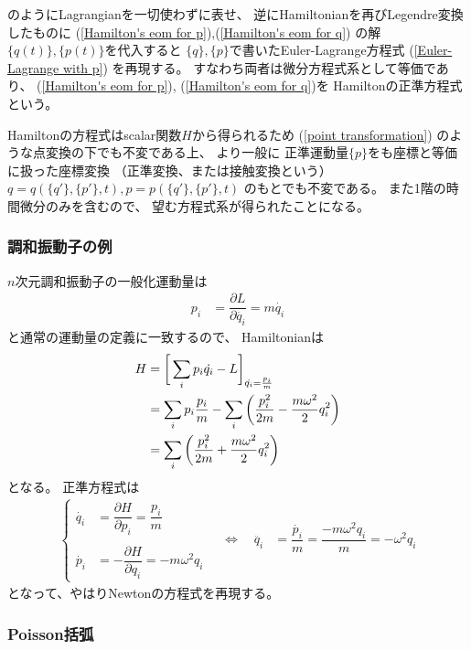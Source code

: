 のようにLagrangianを一切使わずに表せ、
逆にHamiltonianを再びLegendre変換したものに
(\ref{Hamilton's eom for p}),(\ref{Hamilton's eom for q})
の解$\{q(t)\},\{p(t)\}$を代入すると
$\{q\},\{p\}$で書いたEuler-Lagrange方程式
(\ref{Euler-Lagrange with p})
を再現する。
すなわち両者は微分方程式系として等価であり、
(\ref{Hamilton's eom for p}),
(\ref{Hamilton's eom for q})を
Hamiltonの正準方程式という。

Hamiltonの方程式はscalar関数$H$から得られるため
(\ref{point transformation})
のような点変換の下でも不変である上、
より一般に
正準運動量$\{p\}$をも座標と等価に扱った座標変換
（正準変換、または接触変換という）
$q = q(\{q'\}, \{p'\}, t ) ,
p = p(\{q'\}, \{p'\}, t )
$
のもとでも不変である。
また1階の時間微分のみを含むので、
望む方程式系が得られたことになる。

\subsubsection{調和振動子の例}

$n$次元調和振動子の一般化運動量は
\begin{align}
  p_i &= \dfrac{\partial L}{\partial \dot{q_i}}
=
  m \dot{q_i}
\end{align}
と通常の運動量の定義に一致するので、
Hamiltonianは
\begin{align}
  H &= \bigg[
    \sum_i p_i \dot{q_i}
    - L
    \bigg]_{ \dot{q_i} = \frac{p_i}{m} }
\notag\\&=
    \sum_i p_i \frac{p_i}{m}
    -
      \sum_i \bigg(
      \dfrac{p_i^2}{2m}
    -
      \dfrac{ m \omega^2 }{2}
      q_i^2
    \bigg)
\notag\\&=
    \sum_i \bigg(
      \dfrac{p_i^2}{2m}
    +
      \dfrac{ m \omega^2 }{2}
      q_i^2
    \bigg)
\end{align}
となる。
正準方程式は
\begin{align}
  \begin{cases}
    \dot{q_i} &= \dfrac{\partial H}{\partial p_i}
    = \dfrac{p_i}{m}
  \\
  \\
    \dot{p_i} &= - \dfrac{\partial H}{\partial q_i}
    = - m \omega^2 q_i
  \end{cases}
\quad
\Leftrightarrow
\quad
  \ddot{q_i} &= \dfrac{\dot{p_i}}{m}
  = \dfrac{- m \omega^2 q_i}{m}
  = - \omega^2 q_i
\label{hamiltonian e.o.m for harmonic oscillator}
\end{align}
となって、やはりNewtonの方程式を再現する。

\subsubsection{Poisson括弧}

